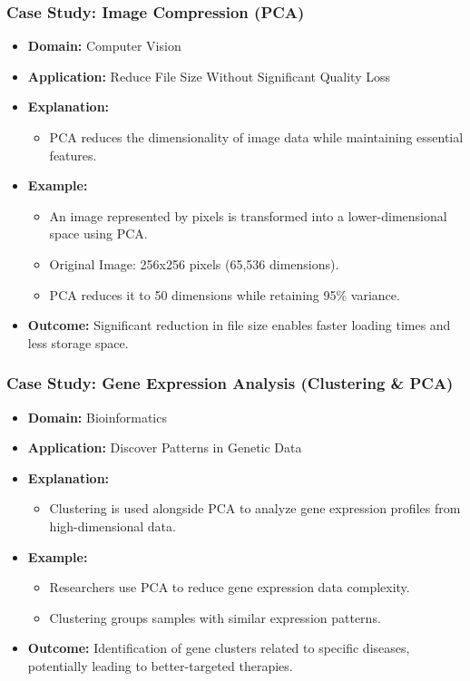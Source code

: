 \documentclass[aspectratio=169]{beamer}
\begin{document}
\begin{frame}[fragile]
    \frametitle{Case Study: Image Compression (PCA)}
    \begin{itemize}
        \item \textbf{Domain:} Computer Vision
        \item \textbf{Application:} Reduce File Size Without Significant Quality Loss
        \item \textbf{Explanation:}
            \begin{itemize}
                \item PCA reduces the dimensionality of image data while maintaining essential features.
            \end{itemize}
        \item \textbf{Example:}
            \begin{itemize}
                \item An image represented by pixels is transformed into a lower-dimensional space using PCA.
                \item Original Image: 256x256 pixels (65,536 dimensions).
                \item PCA reduces it to 50 dimensions while retaining 95\% variance.
            \end{itemize}
        \item \textbf{Outcome:} Significant reduction in file size enables faster loading times and less storage space.
    \end{itemize}
\end{frame}

\begin{frame}[fragile]
    \frametitle{Case Study: Gene Expression Analysis (Clustering \& PCA)}
    \begin{itemize}
        \item \textbf{Domain:} Bioinformatics
        \item \textbf{Application:} Discover Patterns in Genetic Data
        \item \textbf{Explanation:}
            \begin{itemize}
                \item Clustering is used alongside PCA to analyze gene expression profiles from high-dimensional data.
            \end{itemize}
        \item \textbf{Example:}
            \begin{itemize}
                \item Researchers use PCA to reduce gene expression data complexity.
                \item Clustering groups samples with similar expression patterns.
            \end{itemize}
        \item \textbf{Outcome:} Identification of gene clusters related to specific diseases, potentially leading to better-targeted therapies.
    \end{itemize}
\end{frame}
\end{document}
